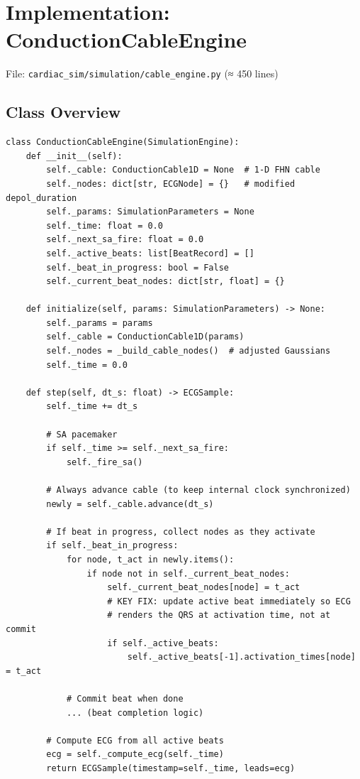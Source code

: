 \documentclass[12pt,a4paper,oneside]{book}
\begin{document}
\section{\phaseIII Implementation: ConductionCableEngine}

File: \texttt{cardiac\_sim/simulation/cable\_engine.py} (≈ 450 lines)

\subsection{Class Overview}

\begin{lstlisting}
class ConductionCableEngine(SimulationEngine):
    def __init__(self):
        self._cable: ConductionCable1D = None  # 1-D FHN cable
        self._nodes: dict[str, ECGNode] = {}   # modified depol_duration
        self._params: SimulationParameters = None
        self._time: float = 0.0
        self._next_sa_fire: float = 0.0
        self._active_beats: list[BeatRecord] = []
        self._beat_in_progress: bool = False
        self._current_beat_nodes: dict[str, float] = {}
    
    def initialize(self, params: SimulationParameters) -> None:
        self._params = params
        self._cable = ConductionCable1D(params)
        self._nodes = _build_cable_nodes()  # adjusted Gaussians
        self._time = 0.0
    
    def step(self, dt_s: float) -> ECGSample:
        self._time += dt_s
        
        # SA pacemaker
        if self._time >= self._next_sa_fire:
            self._fire_sa()
        
        # Always advance cable (to keep internal clock synchronized)
        newly = self._cable.advance(dt_s)
        
        # If beat in progress, collect nodes as they activate
        if self._beat_in_progress:
            for node, t_act in newly.items():
                if node not in self._current_beat_nodes:
                    self._current_beat_nodes[node] = t_act
                    # KEY FIX: update active beat immediately so ECG
                    # renders the QRS at activation time, not at commit
                    if self._active_beats:
                        self._active_beats[-1].activation_times[node] = t_act
            
            # Commit beat when done
            ... (beat completion logic)
        
        # Compute ECG from all active beats
        ecg = self._compute_ecg(self._time)
        return ECGSample(timestamp=self._time, leads=ecg)
\end{lstlisting}
\end{document}
